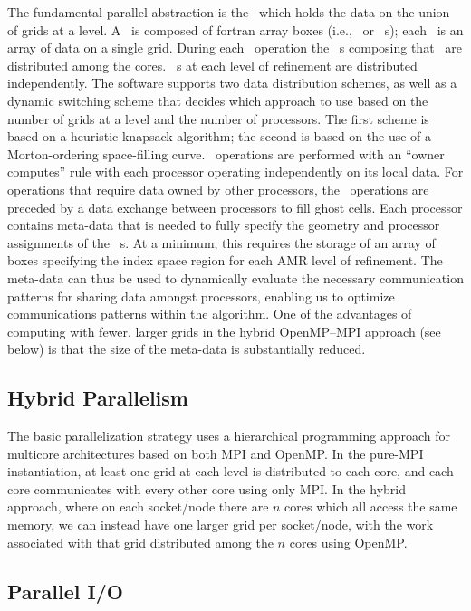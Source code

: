 The fundamental parallel abstraction is the \MultiFab\, which holds the data on the 
union of grids at a level.  A \MultiFab\ is composed of fortran array boxes 
(i.e., \FArrayBox\ or \Fab~s); each \Fab\ is an array of data on a single grid. 
During each \MultiFab\ operation the \Fab~s composing that \MultiFab\ are distributed 
among the cores.  \MultiFab~s at each level of refinement are distributed 
independently.  The software supports two data distribution schemes, as well as a 
dynamic switching scheme that decides which approach to use based on the number of 
grids at a level and the number of processors.  The first scheme is based on a 
heuristic knapsack algorithm; the second is based on the use of a Morton-ordering 
space-filling curve.  \MultiFab\ operations are performed with an ``owner computes'' rule 
with each processor operating independently on its local data.  For operations that 
require data owned by other processors, the \MultiFab\ operations are preceded by a 
data exchange between processors to fill ghost cells.  Each processor contains 
meta-data that is needed 
to fully specify the geometry and processor assignments of the \MultiFab~s. At a 
minimum, this requires the storage of an array of boxes specifying the index space 
region for each AMR level of refinement.  The meta-data can thus be used to 
dynamically evaluate the necessary communication patterns for sharing data amongst 
processors, enabling us to optimize communications patterns within the algorithm.
One of the advantages of computing with fewer, larger grids in the hybrid 
OpenMP--MPI approach (see below) is that the size of the meta-data is substantially 
reduced.

\subsection{Hybrid Parallelism}

The basic parallelization strategy uses a hierarchical programming approach for 
multicore architectures based on both MPI and OpenMP. In the pure-MPI instantiation, at 
least one grid at each level is distributed to each core, and each core communicates 
with every other core using only MPI.  In the hybrid approach, where on each socket/node 
there are $n$ cores which all access the same memory, we can instead have one larger 
grid per socket/node, with the work associated with that grid distributed among the $n$ 
cores using OpenMP.

\subsection{Parallel I/O}

